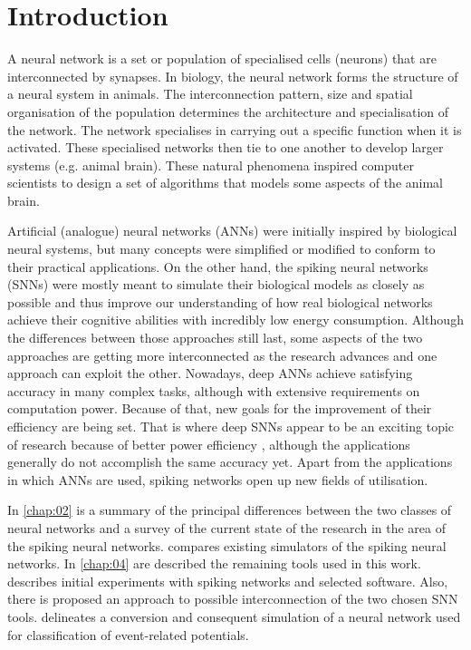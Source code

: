 \chapter{Introduction} \label{chap:01}

A neural network is a set or population of specialised cells (neurons) that are interconnected by synapses. In biology, the neural network forms the structure of a neural system in animals. The interconnection pattern, size and spatial organisation of the population determines the architecture and specialisation of the network. The network specialises in carrying out a specific function when it is activated. These specialised networks then tie to one another to develop larger systems (e.g. animal brain). These natural phenomena inspired computer scientists to design a set of algorithms that models some aspects of the animal brain.

Artificial (analogue) neural networks (ANNs) were initially inspired by biological neural systems, but many concepts were simplified or modified to conform to their practical applications. On the other hand, the spiking neural networks (SNNs) were mostly meant to simulate their biological models as closely as possible and thus improve our understanding of how real biological networks achieve their cognitive abilities with incredibly low energy consumption. Although the differences between those approaches still last, some aspects of the two approaches are getting more interconnected as the research advances and one approach can exploit the other. Nowadays, deep ANNs achieve satisfying accuracy in many complex tasks, although with extensive requirements on computation power. Because of that, new goals for the improvement of their efficiency are being set. That is where deep SNNs appear to be an exciting topic of research because of better power efficiency \cite{caoSpikingDeepConvolutional2015, tavanaeiDeepLearningSpiking2019}, although the applications generally do not accomplish the same accuracy yet. Apart from the applications in which ANNs are used, spiking networks open up new fields of utilisation. \par
In \cref{chap:02} is a summary of the principal differences between the two classes of neural networks and a survey of the current state of the research in the area of the spiking neural networks.  compares existing simulators of the spiking neural networks. In \cref{chap:04} are described the remaining tools used in this work.  describes initial experiments with spiking networks and selected software. Also, there is proposed an approach to possible interconnection of the two chosen SNN tools.  delineates a conversion and consequent simulation of a neural network used for classification of event-related potentials.
